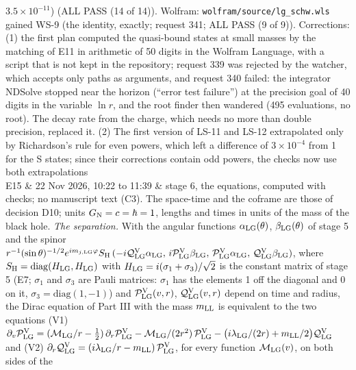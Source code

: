 \documentclass[
  10pt,
]{article}
\begin{document}
\begin{longtable}[]
\(3.5\times10^{-11}\)) (ALL PASS (14 of 14)). Wolfram:
\texttt{wolfram/source/lg\_schw.wls} gained WS-9 (the identity, exactly;
request 341; ALL PASS (9 of 9)). Corrections: (1) the first plan
computed the quasi-bound states at small masses by the matching of E11
in arithmetic of 50 digits in the Wolfram Language, with a script that
is not kept in the repository; request 339 was rejected by the watcher,
which accepts only paths as arguments, and request 340 failed: the
integrator NDSolve stopped near the horizon (``error test failure'') at
the precision goal of 40 digits in the variable \(\ln r\), and the root
finder then wandered (495 evaluations, no root). The decay rate from the
charge, which needs no more than double precision, replaced it. (2) The
first version of LS-11 and LS-12 extrapolated only by Richardson's rule
for even powers, which left a difference of \(3\times10^{-4}\) from 1
for the S states; since their corrections contain odd powers, the checks
now use both extrapolations \\
E15 & 22 Nov 2026, 10:22 to 11:39 & stage 6, the equations, computed
with checks; no manuscript text (C3). The space-time and the coframe are
those of decision D10; units \(G_{\rm N}=c=\hbar=1\), lengths and times
in units of the mass of the black hole. \emph{The separation.} With the
angular functions \(\alpha_{\rm LG}(\theta)\),
\(\beta_{\rm LG}(\theta)\) of stage 5 and the spinor
\(r^{-1}(\sin\theta)^{-1/2}e^{im_{j,{\rm LG}}\varphi}S_{\rm H}\,(-i\mathcal Q^{\rm V}_{\rm LG}\alpha_{\rm LG},\,i\mathcal P^{\rm V}_{\rm LG}\beta_{\rm LG},\,\mathcal P^{\rm V}_{\rm LG}\alpha_{\rm LG},\,\mathcal Q^{\rm V}_{\rm LG}\beta_{\rm LG})\),
where \(S_{\rm H}=\mathrm{diag}(H_{\rm LG},H_{\rm LG})\) with
\(H_{\rm LG}=i(\sigma_1+\sigma_3)/\sqrt2\) is the constant matrix of
stage 5 (E7; \(\sigma_1\) and \(\sigma_3\) are Pauli matrices:
\(\sigma_1\) has the elements 1 off the diagonal and 0 on it,
\(\sigma_3=\mathrm{diag}(1,-1)\)) and
\(\mathcal P^{\rm V}_{\rm LG}(v,r)\),
\(\mathcal Q^{\rm V}_{\rm LG}(v,r)\) depend on time and radius, the
Dirac equation of Part III with the mass \(m_{\rm LL}\) is equivalent to
the two equations (V1)
\(\partial_v\mathcal P^{\rm V}_{\rm LG}=(\mathcal M_{\rm LG}/r-\tfrac12)\,\partial_r\mathcal P^{\rm V}_{\rm LG}-\mathcal M_{\rm LG}/(2r^2)\,\mathcal P^{\rm V}_{\rm LG}-\big(i\lambda_{\rm LG}/(2r)+m_{\rm LL}/2\big)\mathcal Q^{\rm V}_{\rm LG}\)
and (V2)
\(\partial_r\mathcal Q^{\rm V}_{\rm LG}=(i\lambda_{\rm LG}/r-m_{\rm LL})\,\mathcal P^{\rm V}_{\rm LG}\),
for every function \(\mathcal M_{\rm LG}(v)\), on both sides of the

\end{longtable}
\end{document}
